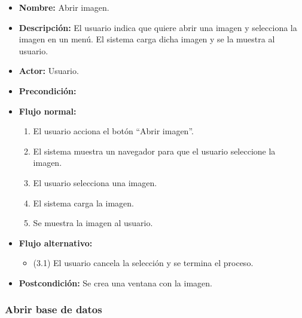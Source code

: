 \begin{itemize}
\item \textbf{Nombre: }Abrir imagen.
\item \textbf{Descripción: }El usuario indica que quiere abrir una imagen y selecciona la imagen en un menú. El sistema carga dicha imagen y se la muestra al usuario.
\item \textbf{Actor: }Usuario.
\item \textbf{Precondición: } 
\item \textbf{Flujo normal: }
\begin{enumerate}
\item El usuario acciona el botón ``Abrir imagen''.
\item El sistema muestra un navegador para que el usuario seleccione la imagen.
\item El usuario selecciona una imagen.
\item El sistema carga la imagen.
\item Se muestra la imagen al usuario.
\end{enumerate}
\item \textbf{Flujo alternativo:}
\begin{itemize}
\item (3.1) El usuario cancela la selección y se termina el proceso.
\end{itemize}
\item \textbf{Postcondición: }Se crea una ventana con la imagen.
\end{itemize}

\newpage

\subsubsection{Abrir base de datos}

